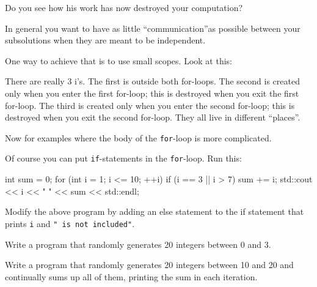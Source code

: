 Do you see how his work has now destroyed your computation?

In general you want to have as little ``communication''as possible
between your subsolutions when they are meant to be independent.

One way to achieve that is to use small scopes. Look at this:
\begin{console}[commandchars=\~\@\$]
~EMPHASIZE@int i$;
int sum = 0;

for (~EMPHASIZE@int i = $}; i < 11; i++)
{   
    sum += i;
}

std::cout << sum << std::endl;

i = a + b;
result = i + c + d + e + f;

for (~EMPHASIZE@int i = 1$; i < 101; i++)
{   
    sum += i;
}

std::cout << sum << std::endl;
\end{console}

There are really 3 i's. The first is outside both
for-loops. The second is created only when you enter the first for-loop;
this is destroyed when you exit the first for-loop. The third is created
only when you enter the second for-loop; this is destroyed when you exit
the second for-loop. They all live in different ``places''.

\newpage{}

Now for examples where the body of the \texttt{for}-loop is more complicated.

Of course you can put \texttt{if}-statements in the \texttt{for}-loop. Run this:
\begin{console}
int sum = 0;
for (int i = 1; i <= 10; ++i)
{   
    if (i == 3 || i > 7)
    {
        sum += i;
        std::cout << i << " " << sum << std::endl;
    }
}
\end{console}

\begin{ex}
Modify the above program by adding an else statement to the if
statement that prints \texttt{i} and \texttt{" is not included"}.
\end{ex}

\begin{ex}
Write a program that randomly generates 20 integers
between 0 and 3.
\end{ex}

\begin{ex}
Write a program that randomly generates 20 integers
between 10 and 20 and continually sums up all of them, printing the sum
in each iteration.
\end{ex}
\newpage{}

